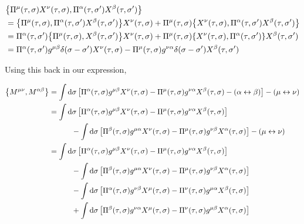 \begin{align*}
    &\acomm{\Pi^\mu\qty(\tau,\sigma)X^\nu\qty(\tau,\sigma)}{\Pi^\alpha\qty(\tau,\sigma')X^\beta\qty(\tau,\sigma')}\\
    &=\acomm{\Pi^\mu\qty(\tau,\sigma)}{\Pi^\alpha\qty(\tau,\sigma')X^\beta\qty(\tau,\sigma')}X^\nu\qty(\tau,\sigma)+\Pi^\mu\qty(\tau,\sigma)\acomm{X^\nu\qty(\tau,\sigma)}{\Pi^\alpha\qty(\tau,\sigma')X^\beta\qty(\tau,\sigma')}\\
    &=\Pi^\alpha\qty(\tau,\sigma')\acomm{\Pi^\mu\qty(\tau,\sigma)}{X^\beta\qty(\tau,\sigma')}X^\nu\qty(\tau,\sigma)+\Pi^\mu\qty(\tau,\sigma)\acomm{X^\nu\qty(\tau,\sigma)}{\Pi^\alpha\qty(\tau,\sigma')}X^\beta\qty(\tau,\sigma')\\
    &=\Pi^\alpha\qty(\tau,\sigma')g^{\mu\beta}\delta\qty(\sigma-\sigma')X^\nu\qty(\tau,\sigma)-\Pi^\mu\qty(\tau,\sigma)g^{\nu\alpha}\delta\qty(\sigma-\sigma')X^\beta\qty(\tau,\sigma')
\end{align*}

Using this back in our expression,

\begin{align*}
    \acomm{M^{\mu\nu}}{M^{\alpha\beta}}&=\int\dd{\sigma}\qty[\Pi^\alpha\qty(\tau,\sigma)g^{\mu\beta}X^\nu\qty(\tau,\sigma)-\Pi^\mu\qty(\tau,\sigma)g^{\nu\alpha}X^\beta\qty(\tau,\sigma)-\qty(\alpha\leftrightarrow\beta)]-\qty(\mu\leftrightarrow\nu)\\
    &=\int\dd{\sigma}\qty[\Pi^\alpha\qty(\tau,\sigma)g^{\mu\beta}X^\nu\qty(\tau,\sigma)-\Pi^\mu\qty(\tau,\sigma)g^{\nu\alpha}X^\beta\qty(\tau,\sigma)]\\
    &\quad\quad\quad-\int\dd{\sigma}\qty[\Pi^\beta\qty(\tau,\sigma)g^{\mu\alpha}X^\nu\qty(\tau,\sigma)-\Pi^\mu\qty(\tau,\sigma)g^{\nu\beta}X^\alpha\qty(\tau,\sigma)]-\qty(\mu\leftrightarrow\nu)\\
    &=\int\dd{\sigma}\qty[\Pi^\alpha\qty(\tau,\sigma)g^{\mu\beta}X^\nu\qty(\tau,\sigma)-\Pi^\mu\qty(\tau,\sigma)g^{\nu\alpha}X^\beta\qty(\tau,\sigma)]\\
    &\quad\quad\quad-\int\dd{\sigma}\qty[\Pi^\beta\qty(\tau,\sigma)g^{\mu\alpha}X^\nu\qty(\tau,\sigma)-\Pi^\mu\qty(\tau,\sigma)g^{\nu\beta}X^\alpha\qty(\tau,\sigma)]\\
    &\quad\quad\quad-\int\dd{\sigma}\qty[\Pi^\alpha\qty(\tau,\sigma)g^{\nu\beta}X^\mu\qty(\tau,\sigma)-\Pi^\nu\qty(\tau,\sigma)g^{\mu\alpha}X^\beta\qty(\tau,\sigma)]\\
    &\quad\quad\quad+\int\dd{\sigma}\qty[\Pi^\beta\qty(\tau,\sigma)g^{\nu\alpha}X^\mu\qty(\tau,\sigma)-\Pi^\nu\qty(\tau,\sigma)g^{\mu\beta}X^\alpha\qty(\tau,\sigma)]
\end{align*}

